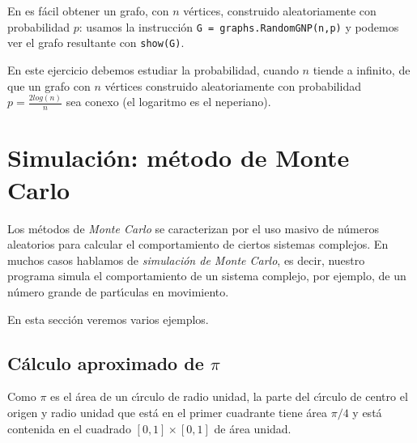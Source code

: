 En {\sage} es f\'acil obtener un grafo, con $n$ v\'ertices,  construido 
aleatoriamente con probabilidad $p$: usamos la instrucci\'on 
\lstinline|G = graphs.RandomGNP(n,p)| y podemos ver el grafo resultante con 
\lstinline|show(G)|.

\begin{ejer}
  En este ejercicio debemos estudiar la probabilidad, cuando $n$ tiende a 
infinito,  de que un grafo con $n$ v\'ertices construido aleatoriamente con 
probabilidad $p=\frac{2log(n)}{n}$ sea conexo (el logaritmo es el neperiano).
  \end{ejer}

 
 
 
 
 
 
 
 
 
 
 \section{Simulaci\'on: m\'etodo de Monte Carlo}\label{monte}
 
Los m\'etodos de {\itshape Monte Carlo} se caracterizan por el uso masivo de
n\'umeros
aleatorios para calcular el comportamiento de ciertos sistemas complejos. En
muchos casos hablamos de {\itshape simulaci\'on de Monte Carlo}, es decir,
nuestro programa simula el comportamiento de un sistema complejo, por ejemplo,
de un n\'umero grande de part\'{\i}culas en movimiento. 

En esta secci\'on veremos varios ejemplos.


\subsection{ C\'alculo aproximado de $\pi$} 
Como $\pi$ es el \'area de un
c\'{\i}rculo de radio unidad, la parte del c\'{\i}rculo de centro el origen y
radio unidad que est\'a en el primer cuadrante tiene \'area $\pi/4$ y est\'a
contenida en el cuadrado $[0,1]\times [0,1]$ de \'area unidad.

